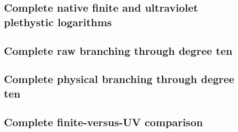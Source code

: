 \documentclass[11pt]{article}
\begin{document}
\clearpage
\begin{landscape}
\section{Complete native finite and ultraviolet plethystic logarithms}
{\footnotesize}
\end{landscape}

\clearpage
\begin{landscape}
\section{Complete raw branching through degree ten}
{\footnotesize}
\end{landscape}

\clearpage
\begin{landscape}
\section{Complete physical branching through degree ten}
{\footnotesize}
\end{landscape}

\clearpage
\begin{landscape}
\section{Complete finite-versus-UV comparison}
{\footnotesize
\renewcommand{\arraystretch}{1.06}%
}
\end{landscape}
\end{document}

